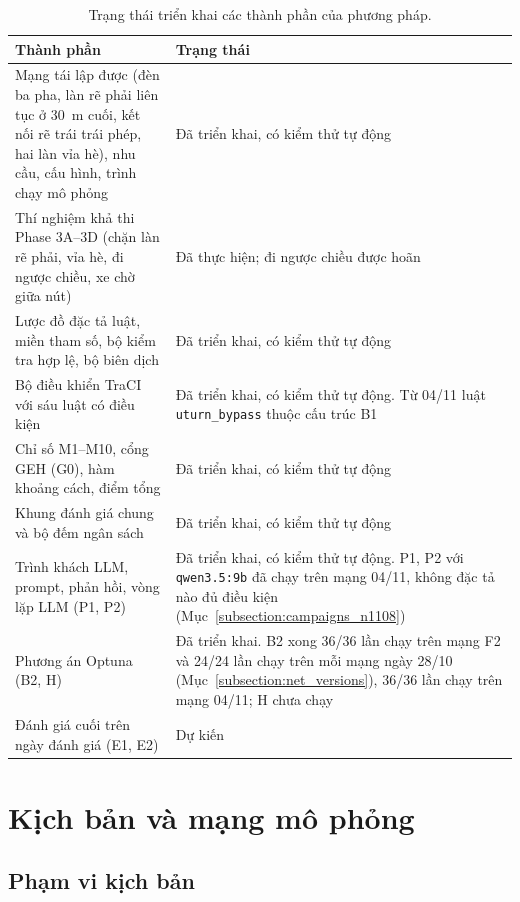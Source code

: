 \documentclass[../main.tex]{subfiles}
\begin{document}
\begin{table}[ht]
\centering
\caption{Trạng thái triển khai các thành phần của phương pháp.}
\label{table:3.1}
\begin{tabular}{|p{6.5cm}|p{7.5cm}|}
\hline
\textbf{Thành phần} & \textbf{Trạng thái} \\ \hline
Mạng tái lập được (đèn ba pha, làn rẽ phải liên tục ở 30~m cuối, kết nối rẽ trái trái phép, hai làn vỉa hè), nhu cầu, cấu hình, trình chạy mô phỏng & Đã triển khai, có kiểm thử tự động \\ \hline
Thí nghiệm khả thi Phase 3A--3D (chặn làn rẽ phải, vỉa hè, đi ngược chiều, xe chờ giữa nút) & Đã thực hiện; đi ngược chiều được hoãn \\ \hline
Lược đồ đặc tả luật, miền tham số, bộ kiểm tra hợp lệ, bộ biên dịch & Đã triển khai, có kiểm thử tự động \\ \hline
Bộ điều khiển TraCI với sáu luật có điều kiện & Đã triển khai, có kiểm thử tự động. Từ 04/11 luật \texttt{uturn\_bypass} thuộc cấu trúc B1 \\ \hline
Chỉ số M1--M10, cổng GEH (G0), hàm khoảng cách, điểm tổng & Đã triển khai, có kiểm thử tự động \\ \hline
Khung đánh giá chung và bộ đếm ngân sách & Đã triển khai, có kiểm thử tự động \\ \hline
Trình khách LLM, prompt, phản hồi, vòng lặp LLM (P1, P2) & Đã triển khai, có kiểm thử tự động. P1, P2 với \texttt{qwen3.5:9b} đã chạy trên mạng 04/11, không đặc tả nào đủ điều kiện (Mục~\ref{subsection:campaigns_n1108}) \\ \hline
Phương án Optuna (B2, H) & Đã triển khai. B2 xong 36/36 lần chạy trên mạng F2 và 24/24 lần chạy trên mỗi mạng ngày 28/10 (Mục~\ref{subsection:net_versions}), 36/36 lần chạy trên mạng 04/11; H chưa chạy \\ \hline
Đánh giá cuối trên ngày đánh giá (E1, E2) & Dự kiến \\ \hline
\end{tabular}
\end{table}

\section{Kịch bản và mạng mô phỏng}
\label{section:3.2}

\subsection{Phạm vi kịch bản}
\end{document}
